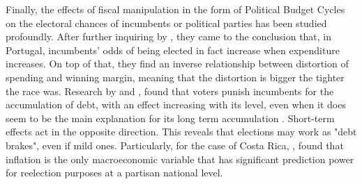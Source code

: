 Finally, the effects of fiscal manipulation in the form of Political Budget Cycles on the electoral chances of incumbents or political parties has been studied profoundly. After further inquiring by \textcite{aidt2011}, they came to the conclusion that, in Portugal, incumbents' odds of being elected in fact increase when expenditure increases. On top of that, they find an inverse relationship between distortion of spending and winning margin, meaning that the distortion is bigger the tighter the race was. Research by \textcite{drazen2010} and \textcite{cassette2014}, found that voters punish incumbents for the accumulation of debt, with an effect increasing with its level, even when it does seem to be the main explanation for its long term accumulation \parencite{alesina2016}. Short-term effects act in the opposite direction. This reveals that elections may work as "debt brakes", even if mild ones. Particularly, for the case of Costa Rica, \textcite{hernandez2014}, found that inflation is the only macroeconomic variable that has significant prediction power for reelection purposes at a partisan national level. 

